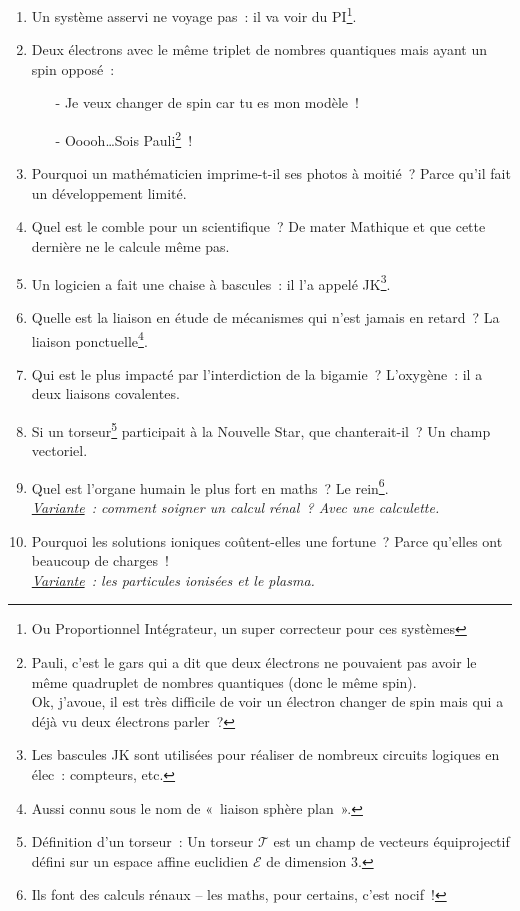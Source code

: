 \documentclass[10pt,a5paper,fullpage]{book}
\begin{document}
\begin{enumerate}
		\item Un système asservi ne voyage pas~: il va voir du PI\footnote{Ou Proportionnel Intégrateur, un super correcteur pour ces systèmes}. 
		\item Deux électrons avec le même triplet de nombres quantiques mais ayant un spin opposé~:
		\begin{itemize}
			\item[-] Je veux changer de spin car tu es mon modèle~!
			\item[-] Ooooh\ldots Sois Pauli\footnote{Pauli, c’est le gars qui a dit que deux électrons ne pouvaient pas avoir le même quadruplet de nombres quantiques (donc le même spin). \\Ok, j’avoue, il est très difficile de voir un électron changer de spin mais qui a déjà vu deux électrons parler~?}~!
		\end{itemize}
		\item Pourquoi un mathématicien imprime-t-il ses photos à moitié~? Parce qu’il fait un développement limité.
		\item Quel est le comble pour un scientifique~? De mater Mathique et que cette dernière ne le calcule même pas.
		\item Un logicien a fait une chaise à bascules~: il l'a appelé JK\footnote{Les bascules JK sont utilisées pour réaliser de nombreux circuits logiques en élec~: compteurs, etc.}.
		\item Quelle est la liaison en étude de mécanismes qui n’est jamais en retard~? La liaison ponctuelle\footnote{Aussi connu sous le nom de « liaison sphère plan ».}.
		\item Qui est le plus impacté par l’interdiction de la bigamie~? L’oxygène~: il a deux liaisons covalentes.
		\item Si un torseur\footnote{Définition d'un torseur~: Un torseur ${\mathcal {T}}$ est un champ de vecteurs équiprojectif défini sur un espace affine euclidien $\mathcal{E}$ de dimension 3.} participait à la Nouvelle Star, que chanterait-il~? Un champ vectoriel.	
		\item Quel est l’organe humain le plus fort en maths~? Le rein\footnote{Ils font des calculs rénaux -- les maths, pour certains, c’est nocif~!}. \\\textit{\underline{Variante}~: comment soigner un calcul rénal~? Avec une calculette.}
		\item Pourquoi les solutions ioniques coûtent-elles une fortune~? Parce qu’elles ont beaucoup de charges~! \\ \textit{\underline{Variante}~: les particules ionisées et le plasma.}

\end{enumerate}
\end{document}
